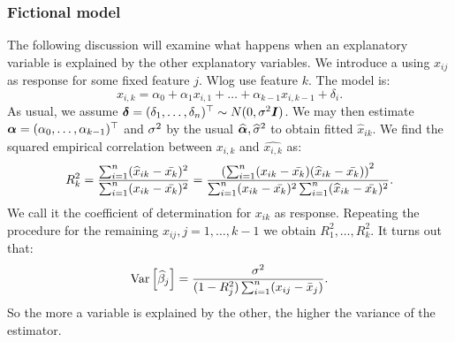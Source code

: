 \subsubsection{Fictional model}
The following discussion will examine what happens when an explanatory variable is explained by the other explanatory variables. We introduce a  using $x_{ij}$ as response for some fixed feature $j$. Wlog use feature $k$. The model is:
$$
    x_{i,k} = \alpha_0 + \alpha_1 x_{i,1} + \dots + \alpha_{k-1} x_{i, k-1} + \delta_i.
$$
As usual, we assume $\boldsymbol{\delta}=(\delta_1,\dots,\delta_n)^\top\sim N(0, \sigma^2\boldsymbol{I})$. We may then estimate $\boldsymbol{\alpha}=(\alpha_0,\dots,\alpha_{k-1})^\top$ and $\sigma^2$ by the usual $\widehat{\boldsymbol{\alpha}}, \widehat{\sigma}^2$ to obtain fitted $\hat{x}_{ik}$. We find the squared empirical correlation between $x_{i,k}$ and $\hat{x_{i,k}}$ as:
$$
    R_k^2 
    = \frac{\sum_{i=1}^n (\widehat{x}_{ik}-\bar{x_k})^2}{\sum_{i=1}^n ({x}_{ik}-\bar{x_k})^2} 
    = \frac{\left( \sum_{i=1}^n ({x}_{ik}-\bar{x_k})(\widehat{x}_{ik}-\bar{x_k}) \right)^2}
    {\sum_{i=1}^n ({x}_{ik}-\bar{x_k})^2\sum_{i=1}^n (\widehat{x}_{ik}-\bar{x_k})^2}.
$$
We call it the coefficient of determination for $x_{ik}$ as response. Repeating the procedure for the remaining $x_{ij}, j=1,\dots,k-1$ we obtain $R_1^2,\dots,R_k^2$. It turns out that:
$$
    \mathrm{Var}\left[\widehat{\beta}_j\right] = \frac{\sigma^2}{(1-R_j^2)\sum_{i=1}^n(x_{ij}-\bar{x}_j)}.
$$
So the more a variable is explained by the other, the higher the variance of the estimator.

